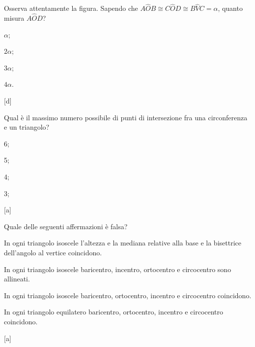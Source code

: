 \noindent\begin{minipage}{0.65\textwidth}\parindent15pt
\begin{esercizio}
\label{ese:5.64}
Osserva attentamente la figura. Sapendo che $A\widehat{O}B\cong 
C\widehat{O}D\cong B\widehat{V}C=\alpha$, quanto misura 
$A\widehat{O}D$?
\begin{multicols}{4}
\begin{enumeratea}
\item $\alpha$;
\item $2\alpha$;
\item $3\alpha$;
\item $4\alpha$.
\end{enumeratea}
\end{multicols}
\hfill [d]
\end{esercizio}
\end{minipage}\hfil
\begin{minipage}{0.35\textwidth}
	\centering
\end{minipage}\vspace{5pt}

\begin{esercizio}
\label{ese:5.65}
Qual è il massimo numero possibile di punti di intersezione fra una 
circonferenza e un triangolo?
\begin{multicols}{4}
\begin{enumeratea}
\item 6;
\item 5;
\item 4;
\item 3;
\end{enumeratea}
\end{multicols}
\hfill [a]
\end{esercizio}

\newpage %

\begin{esercizio}
\label{ese:5.66}
Quale delle seguenti affermazioni è falsa? 
\begin{enumeratea}
\item In ogni triangolo isoscele l'altezza e la mediana relative alla 
base e la bisettrice dell'angolo al vertice coincidono.
\item In ogni triangolo isoscele baricentro, incentro, ortocentro e 
circocentro sono allineati.
\item In ogni triangolo isoscele baricentro, ortocentro, incentro e 
circocentro coincidono.
\item In ogni triangolo equilatero baricentro, ortocentro, incentro e 
circocentro coincidono.
\end{enumeratea}
\hfill [a]
\end{esercizio}

